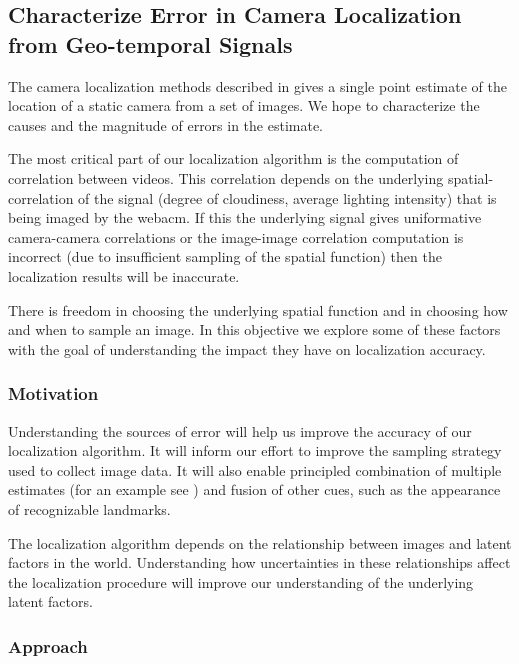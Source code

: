%
%
%
\subsection{Characterize Error in Camera Localization from
Geo-temporal Signals}
\label{sec:localizationError}

The camera localization methods described in
 gives a single point estimate of the
location of a static camera from a set of images.  We hope to
characterize the causes and the magnitude of errors in the estimate.

The most critical part of our localization algorithm is the
computation of correlation between videos.  This correlation depends
on the underlying spatial-correlation of the signal (\eg degree of
cloudiness, average lighting intensity) that is being
imaged by the webacm.  If this  the underlying signal gives
uniformative camera-camera correlations or the image-image correlation
computation is incorrect (\eg due to insufficient sampling of the
spatial function) then the localization results will be inaccurate.

There is freedom in choosing the underlying spatial function and in
choosing how and when to sample an image.  In this objective we
explore some of these factors with the goal of understanding the
impact they have on localization accuracy.

\subsubsection{Motivation}

Understanding the sources of error will help us improve the accuracy
of our localization algorithm.  It will inform our effort to improve
the sampling strategy used to collect image data.  It will also enable
principled combination of multiple estimates (for an example see
) and fusion of other cues, such as the
appearance of recognizable landmarks.

The localization algorithm depends on the relationship between images
and latent factors in the world.  Understanding how uncertainties in
these relationships affect the localization procedure will improve our
understanding of the underlying latent factors.

\subsubsection{Approach}

